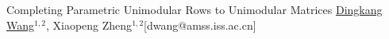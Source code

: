 \begin{abstract_online}{Completing Parametric Unimodular Rows to Unimodular Matrices}{%
        \underline{Dingkang Wang}$^{1,2}$, Xiaopeng Zheng$^{1,2}$}{[dwang@amss.iss.ac.cn]
        }
% 
% 

\end{abstract_online}
